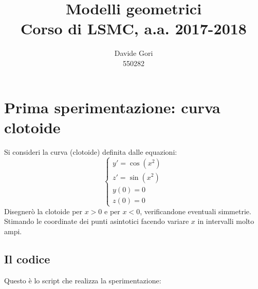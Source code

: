 \documentclass{article}
\title{Modelli geometrici\\
	Corso di LSMC, a.a. 2017-2018}
\author{Davide Gori\\
	550282}
\begin{document}
	\maketitle
	\section{Prima sperimentazione: curva clotoide}
	Si consideri la curva (clotoide) definita dalle equazioni:
	\begin{equation}
	\begin{cases}
	y'=\cos(x^2) \\
	z'=\sin(x^2) \\
	y(0)=0\\
	z(0)=0
	\end{cases}
	\end{equation}
	Disegnerò la clotoide per $x>0$ e per $x<0$, verificandone eventuali simmetrie. Stimando le coordinate dei punti asintotici facendo variare $x$ in intervalli molto ampi.
	\subsection{Il codice}
	Questo è lo script che realizza la sperimentazione:
	
\end{document}
